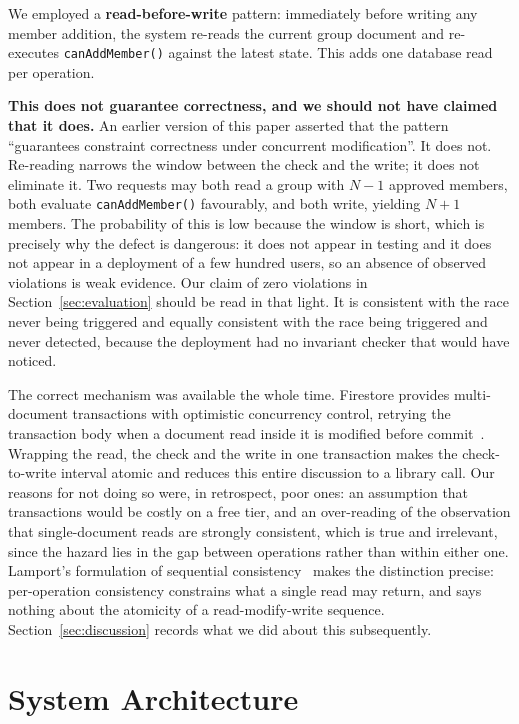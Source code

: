 \documentclass[11pt,a4paper]{article}
\theoremstyle{plain}
\theoremstyle{definition}
\theoremstyle{remark}
\begin{document}
We employed a \textbf{read-before-write} pattern: immediately before writing any member addition, the system re-reads the current group document and re-executes \texttt{canAddMember()} against the latest state. This adds one database read per operation.

\textbf{This does not guarantee correctness, and we should not have claimed that it does.} An earlier version of this paper asserted that the pattern ``guarantees constraint correctness under concurrent modification''. It does not. Re-reading narrows the window between the check and the write; it does not eliminate it. Two requests may both read a group with $N-1$ approved members, both evaluate \texttt{canAddMember()} favourably, and both write, yielding $N+1$ members. The probability of this is low because the window is short, which is precisely why the defect is dangerous: it does not appear in testing and it does not appear in a deployment of a few hundred users, so an absence of observed violations is weak evidence. Our claim of zero violations in Section~\ref{sec:evaluation} should be read in that light. It is consistent with the race never being triggered and equally consistent with the race being triggered and never detected, because the deployment had no invariant checker that would have noticed.

The correct mechanism was available the whole time. Firestore provides multi-document transactions with optimistic concurrency control, retrying the transaction body when a document read inside it is modified before commit~\cite{firebase-transactions, firestore-consistency2019}. Wrapping the read, the check and the write in one transaction makes the check-to-write interval atomic and reduces this entire discussion to a library call. Our reasons for not doing so were, in retrospect, poor ones: an assumption that transactions would be costly on a free tier, and an over-reading of the observation that single-document reads are strongly consistent, which is true and irrelevant, since the hazard lies in the gap between operations rather than within either one. Lamport's formulation of sequential consistency~\cite{lamport1979} makes the distinction precise: per-operation consistency constrains what a single read may return, and says nothing about the atomicity of a read-modify-write sequence. Section~\ref{sec:discussion} records what we did about this subsequently.

\section{System Architecture}
\label{sec:architecture}
\end{document}
